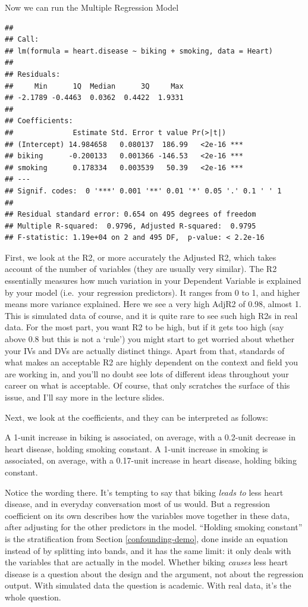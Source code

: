 \documentclass[
]{book}
\begin{document}
Now we can run the Multiple Regression Model

\begin{verbatim}
## 
## Call:
## lm(formula = heart.disease ~ biking + smoking, data = Heart)
## 
## Residuals:
##     Min      1Q  Median      3Q     Max 
## -2.1789 -0.4463  0.0362  0.4422  1.9331 
## 
## Coefficients:
##              Estimate Std. Error t value Pr(>|t|)    
## (Intercept) 14.984658   0.080137  186.99   <2e-16 ***
## biking      -0.200133   0.001366 -146.53   <2e-16 ***
## smoking      0.178334   0.003539   50.39   <2e-16 ***
## ---
## Signif. codes:  0 '***' 0.001 '**' 0.01 '*' 0.05 '.' 0.1 ' ' 1
## 
## Residual standard error: 0.654 on 495 degrees of freedom
## Multiple R-squared:  0.9796, Adjusted R-squared:  0.9795 
## F-statistic: 1.19e+04 on 2 and 495 DF,  p-value: < 2.2e-16
\end{verbatim}

First, we look at the R2, or more accurately the Adjusted R2, which takes account of the number of variables (they are usually very similar). The R2 essentially measures how much variation in your Dependent Variable is explained by your model (i.e.~your regression predictors). It ranges from 0 to 1, and higher means more variance explained. Here we see a very high AdjR2 of 0.98, almost 1. This is simulated data of course, and it is quite rare to see such high R2s in real data. For the most part, you want R2 to be high, but if it gets too high (say above 0.8 but this is not a `rule') you might start to get worried about whether your IVs and DVs are actually distinct things. Apart from that, standards of what makes an acceptable R2 are highly dependent on the context and field you are working in, and you'll no doubt see lots of different ideas throughout your career on what is acceptable. Of course, that only scratches the surface of this issue, and I'll say more in the lecture slides.

Next, we look at the coefficients, and they can be interpreted as follows:

A 1-unit increase in biking is associated, on average, with a 0.2-unit decrease in heart disease, holding smoking constant. A 1-unit increase in smoking is associated, on average, with a 0.17-unit increase in heart disease, holding biking constant.

Notice the wording there. It's tempting to say that biking \emph{leads to} less heart disease, and in everyday conversation most of us would. But a regression coefficient on its own describes how the variables move together in these data, after adjusting for the other predictors in the model. ``Holding smoking constant'' is the stratification from Section \ref{confounding-demo}, done inside an equation instead of by splitting into bands, and it has the same limit: it only deals with the variables that are actually in the model. Whether biking \emph{causes} less heart disease is a question about the design and the argument, not about the regression output. With simulated data the question is academic. With real data, it's the whole question.
\end{document}
